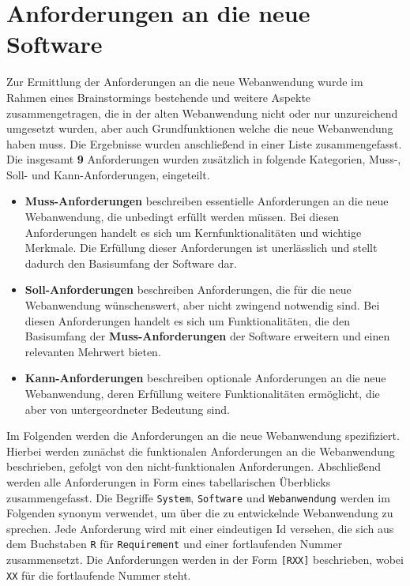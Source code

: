 
\chapter{Anforderungen an die neue Software}
\label{chapter:4}

Zur Ermittlung der Anforderungen an die neue Webanwendung wurde im Rahmen eines Brainstormings bestehende und weitere Aspekte zusammengetragen, die in der alten Webanwendung nicht oder nur unzureichend umgesetzt wurden, aber auch Grundfunktionen welche die neue Webanwendung haben muss. Die Ergebnisse wurden anschließend in einer Liste zusammengefasst. Die insgesamt \textbf{9} Anforderungen wurden zusätzlich in folgende Kategorien, Muss-, Soll- und Kann-Anforderungen, eingeteilt.

\begin{itemize}
    \item \textbf{Muss-Anforderungen} beschreiben essentielle Anforderungen an die neue Webanwendung, die unbedingt erfüllt werden müssen. Bei diesen Anforderungen handelt es sich um Kernfunktionalitäten und wichtige Merkmale. Die Erfüllung dieser Anforderungen ist unerlässlich und stellt dadurch den Basisumfang der Software dar.

    \item \textbf{Soll-Anforderungen} beschreiben Anforderungen, die für die neue Webanwendung wünschenswert, aber nicht zwingend notwendig sind. Bei diesen Anforderungen handelt es sich um Funktionalitäten, die den Basisumfang der \textbf{Muss-Anforderungen} der Software erweitern und einen relevanten Mehrwert bieten.

    \item \textbf{Kann-Anforderungen} beschreiben optionale Anforderungen an die neue Webanwendung, deren Erfüllung weitere Funktionalitäten ermöglicht, die aber von untergeordneter Bedeutung sind.
\end{itemize}

Im Folgenden werden die Anforderungen an die neue Webanwendung spezifiziert. Hierbei werden zunächst die funktionalen Anforderungen an die Webanwendung beschrieben, gefolgt von den nicht-funktionalen Anforderungen. Abschließend werden alle Anforderungen in Form eines tabellarischen Überblicks zusammengefasst. Die Begriffe \texttt{System}, \texttt{Software} und \texttt{Webanwendung} werden im Folgenden synonym verwendet, um über die zu entwickelnde Webanwendung zu sprechen. Jede Anforderung wird mit einer eindeutigen Id versehen, die sich aus dem Buchstaben \texttt{R} für \texttt{Requirement} und einer fortlaufenden Nummer zusammensetzt. Die Anforderungen werden in der Form \texttt{[RXX]} beschrieben, wobei \texttt{XX} für die fortlaufende Nummer steht.

